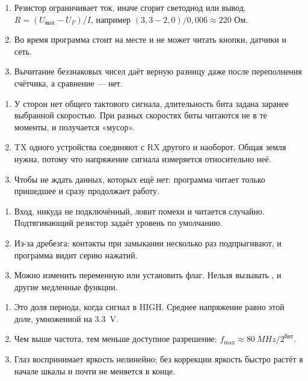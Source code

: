 \begin{enumerate}
  \item Резистор ограничивает ток, иначе сгорит светодиод или вывод. $R = (U_\text{вых} - U_F) / I$, например $(3{,}3 - 2{,}0)/0{,}006 \approx 220$ Ом.
  \item Во время  программа стоит на месте и не может читать кнопки, датчики и сеть.
  \item Вычитание беззнаковых чисел даёт верную разницу даже после переполнения счётчика, а сравнение  --- нет.
\end{enumerate}

\begin{enumerate}
  \item У сторон нет общего тактового сигнала, длительность бита задана заранее выбранной скоростью. При разных скоростях биты читаются не в те моменты, и получается «мусор».
  \item TX одного устройства соединяют с RX другого и наоборот. Общая земля нужна, потому что напряжение сигнала измеряется относительно неё.
  \item Чтобы не ждать данных, которых ещё нет: программа читает только пришедшее и сразу продолжает работу.
\end{enumerate}

\begin{enumerate}
  \item Вход, никуда не подключённый, ловит помехи и читается случайно. Подтягивающий резистор задаёт уровень по умолчанию.
  \item Из-за дребезга: контакты при замыкании несколько раз подпрыгивают, и программа видит серию нажатий.
  \item Можно изменить переменную или установить флаг. Нельзя вызывать ,  и другие медленные функции.
\end{enumerate}

\begin{enumerate}
  \item Это доля периода, когда сигнал в HIGH. Среднее напряжение равно этой доле, умноженной на \SI{3.3}{V}.
  \item Чем выше частота, тем меньше доступное разрешение: $f_\text{max} \approx \SI{80}{MHz} / 2^\text{бит}$.
  \item Глаз воспринимает яркость нелинейно; без коррекции яркость быстро растёт в начале шкалы и почти не меняется в конце.
\end{enumerate}

